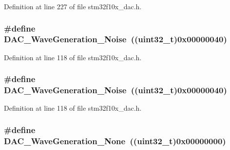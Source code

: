 Definition at line 227 of file stm32f10x\+\_\+dac.\+h.

\subsubsection[{\texorpdfstring{D\+A\+C\+\_\+\+Wave\+Generation\+\_\+\+Noise}{DAC_WaveGeneration_Noise}}]{\setlength{\rightskip}{0pt plus 5cm}\#define D\+A\+C\+\_\+\+Wave\+Generation\+\_\+\+Noise~(({\bf uint32\+\_\+t})0x00000040)}\hypertarget{group___d_a_c__wave__generation_ga1692990325098cae6f32182c1fa0f61e}{}\label{group___d_a_c__wave__generation_ga1692990325098cae6f32182c1fa0f61e}


Definition at line 118 of file stm32f10x\+\_\+dac.\+h.

\subsubsection[{\texorpdfstring{D\+A\+C\+\_\+\+Wave\+Generation\+\_\+\+Noise}{DAC_WaveGeneration_Noise}}]{\setlength{\rightskip}{0pt plus 5cm}\#define D\+A\+C\+\_\+\+Wave\+Generation\+\_\+\+Noise~(({\bf uint32\+\_\+t})0x00000040)}\hypertarget{group___d_a_c__wave__generation_ga1692990325098cae6f32182c1fa0f61e}{}\label{group___d_a_c__wave__generation_ga1692990325098cae6f32182c1fa0f61e}


Definition at line 118 of file stm32f10x\+\_\+dac.\+h.

\subsubsection[{\texorpdfstring{D\+A\+C\+\_\+\+Wave\+Generation\+\_\+\+None}{DAC_WaveGeneration_None}}]{\setlength{\rightskip}{0pt plus 5cm}\#define D\+A\+C\+\_\+\+Wave\+Generation\+\_\+\+None~(({\bf uint32\+\_\+t})0x00000000)}\hypertarget{group___d_a_c__wave__generation_gaabbcd575d6106267f6b65ce988158f29}{}\label{group___d_a_c__wave__generation_gaabbcd575d6106267f6b65ce988158f29}


